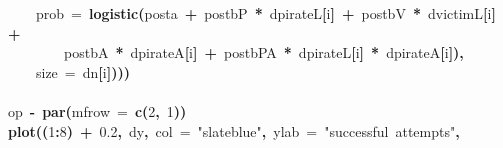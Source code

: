 \documentclass{article}
\makeatletter
\newcommand{\hlnumber}[1]{\textcolor[rgb]{0,0,0}{#1}}%
\newcommand{\hlfunctioncall}[1]{\textcolor[rgb]{.5,0,.33}{\textbf{#1}}}%
\newcommand{\hlstring}[1]{\textcolor[rgb]{.6,.6,1}{#1}}%
\newcommand{\hlkeyword}[1]{\textbf{#1}}%
\newcommand{\hlargument}[1]{\textcolor[rgb]{.69,.25,.02}{#1}}%
\newcommand{\hlassignement}[1]{\textbf{#1}}%
\newcommand{\hlsymbol}[1]{#1}%
\newcommand{\hlstd}[1]{\textcolor[rgb]{0,0,0}{#1}}%
\newenvironment{kframe}{%
 \def\FrameCommand##1{\hskip\@totalleftmargin \hskip-\fboxsep
 \colorbox{shadecolor}{##1}\hskip-\fboxsep
     \hskip-\linewidth \hskip-\@totalleftmargin \hskip\columnwidth}%
 \MakeFramed {\advance\hsize-\width
   \@totalleftmargin\z@ \linewidth\hsize
   \@setminipage}}%
 {\par\unskip\endMakeFramed}
\newenvironment{knitrout}{}{} %
\makeatother
\begin{document}
\begin{knitrout}
{\begin{kframe}
\begin{flushleft}
\hlstd{}{\ }{\ }{\ }{\ }\hlargument{prob}{\ }\hlargument{=}{\ }\hlfunctioncall{logistic}\hlkeyword{(}\hlsymbol{post}\hlkeyword{\usebox{\hlnormalsizeboxdollar}}\hlsymbol{a}{\ }\hlkeyword{+}{\ }\hlsymbol{post}\hlkeyword{\usebox{\hlnormalsizeboxdollar}}\hlsymbol{bP}{\ }\hlkeyword{*}{\ }\hlsymbol{d}\hlkeyword{\usebox{\hlnormalsizeboxdollar}}\hlsymbol{pirateL}\hlkeyword{[}\hlsymbol{i}\hlkeyword{]}{\ }\hlkeyword{+}{\ }\hlsymbol{post}\hlkeyword{\usebox{\hlnormalsizeboxdollar}}\hlsymbol{bV}{\ }\hlkeyword{*}{\ }\hlsymbol{d}\hlkeyword{\usebox{\hlnormalsizeboxdollar}}\hlsymbol{victimL}\hlkeyword{[}\hlsymbol{i}\hlkeyword{]}{\ }\hlkeyword{+}\hspace*{\fill}\\
\hlstd{}{\ }{\ }{\ }{\ }{\ }{\ }{\ }{\ }\hlsymbol{post}\hlkeyword{\usebox{\hlnormalsizeboxdollar}}\hlsymbol{bA}{\ }\hlkeyword{*}{\ }\hlsymbol{d}\hlkeyword{\usebox{\hlnormalsizeboxdollar}}\hlsymbol{pirateA}\hlkeyword{[}\hlsymbol{i}\hlkeyword{]}{\ }\hlkeyword{+}{\ }\hlsymbol{post}\hlkeyword{\usebox{\hlnormalsizeboxdollar}}\hlsymbol{bPA}{\ }\hlkeyword{*}{\ }\hlsymbol{d}\hlkeyword{\usebox{\hlnormalsizeboxdollar}}\hlsymbol{pirateL}\hlkeyword{[}\hlsymbol{i}\hlkeyword{]}{\ }\hlkeyword{*}{\ }\hlsymbol{d}\hlkeyword{\usebox{\hlnormalsizeboxdollar}}\hlsymbol{pirateA}\hlkeyword{[}\hlsymbol{i}\hlkeyword{]}\hlkeyword{)}\hlkeyword{,}\hspace*{\fill}\\
\hlstd{}{\ }{\ }{\ }{\ }\hlargument{size}{\ }\hlargument{=}{\ }\hlsymbol{d}\hlkeyword{\usebox{\hlnormalsizeboxdollar}}\hlsymbol{n}\hlkeyword{[}\hlsymbol{i}\hlkeyword{]}\hlkeyword{)}\hlkeyword{)}\hlkeyword{)}\hspace*{\fill}\\
\hlstd{}\hspace*{\fill}\\
\hlstd{}\hlsymbol{op}{\ }\hlassignement{\usebox{\hlnormalsizeboxlessthan}-}{\ }\hlfunctioncall{par}\hlkeyword{(}\hlargument{mfrow}{\ }\hlargument{=}{\ }\hlfunctioncall{c}\hlkeyword{(}\hlnumber{2}\hlkeyword{,}{\ }\hlnumber{1}\hlkeyword{)}\hlkeyword{)}\hspace*{\fill}\\
\hlstd{}\hlfunctioncall{plot}\hlkeyword{(}\hlkeyword{(}\hlnumber{1}\hlkeyword{:}\hlnumber{8}\hlkeyword{)}{\ }\hlkeyword{+}{\ }\hlnumber{0.2}\hlkeyword{,}{\ }\hlsymbol{d}\hlkeyword{\usebox{\hlnormalsizeboxdollar}}\hlsymbol{y}\hlkeyword{,}{\ }\hlargument{col}{\ }\hlargument{=}{\ }\hlstring{"slateblue"}\hlkeyword{,}{\ }\hlargument{ylab}{\ }\hlargument{=}{\ }\hlstring{"successful{\ }attempts"}\hlkeyword{,}\hspace*{\fill}\\

\end{flushleft}
\end{kframe}}
\end{knitrout}
\end{document}
